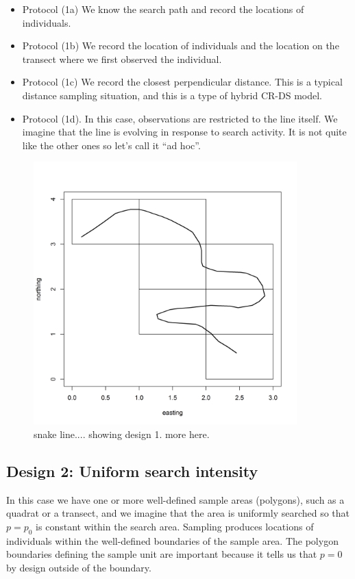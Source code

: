 \begin{itemize}
 \item[] Protocol (1a) We know the search path and record the locations of individuals.
 \item[] Protocol (1b) We record the location of individuals and
   the location on the transect where we first observed the individual.
 \item[] Protocol (1c) We record
the closest perpendicular distance. This is a typical
   distance sampling situation, and this is a type of hybrid CR-DS model.
 \item[] Protocol (1d). In this case, observations are restricted to
   the line itself. We imagine that the line is evolving in response
   to search activity. It is not quite like the other ones so let's
   call it ``ad hoc''.
 \end{itemize}


\begin{figure}
\centering
\includegraphics[width=4in,height=4in]{Ch15-searchencounter/figs/snakeline.png}
\caption{snake line.... showing design 1. more here.
}
\label{searchencounter.fig.snakeline}
\end{figure}


\subsection{Design 2: Uniform search intensity}

In this case we
have one or more well-defined sample areas (polygons), such as a
quadrat or a transect, and we imagine that the area is uniformly
searched so that $p = p_0$ is constant within the search area.
Sampling produces locations of individuals within the well-defined
boundaries of the sample area. The polygon boundaries defining the
sample unit are important because it tells us that $p=0$ by design
outside of the boundary.

